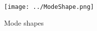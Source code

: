 \documentclass{article}
\begin{document}
       
	

	

\begin{figure}
\centering
\texttt{[image: ../ModeShape.png]}
\caption{Mode shapes}
\label{ModeShape}
\end{figure}


	

\end{document}
